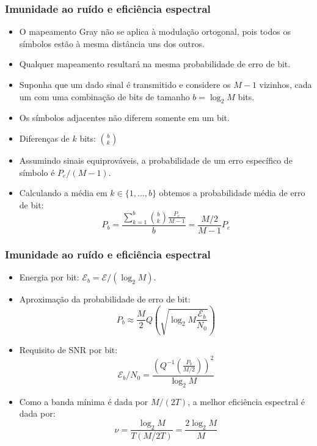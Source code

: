 \begin{frame}
	\frametitle{Imunidade ao ruído e eficiência espectral}

	\begin{itemize}
	    \item O mapeamento Gray não se aplica à modulação ortogonal, pois todos os símbolos estão à mesma distância uns dos outros.
	    \item Qualquer mapeamento resultará na mesma probabilidade de erro de bit.
	    \item Suponha que um dado sinal é transmitido e considere os $M-1$ vizinhos, cada um com uma combinação de bits de tamanho $b=\log_2 M$ bits.
	    \item Os símbolos adjacentes não diferem somente em um bit.
	    \item Diferenças de $k$ bits: $\binom{b}{k}$	    
	    \item Assumindo sinais equiprováveis, a probabilidade de um erro específico de símbolo é $P_e/(M-1)$.
	    \item Calculando a média em $k\in \{1,\ldots,b \}$ obtemos a probabilidade média de erro de bit:
	    \begin{equation*}
		P_b = \frac{\sum\limits_{k=1}^b \binom{b}{k}\frac{P_e}{M-1}}{b} = \frac{M/2}{M-1}P_e
	    \end{equation*}	
	\end{itemize}	
\end{frame}

\begin{frame}
	\frametitle{Imunidade ao ruído e eficiência espectral}

	\begin{itemize}
	    \item Energia por bit: $\mathcal{E}_b = \mathcal{E} / (\log_2 M)$.
	    \item Aproximação da probabilidade de erro de bit:
	    \begin{equation*}
		  P_b \approx \frac{M}{2}Q\left(\sqrt{\log_2 M \frac{\mathcal{E}_b}{N_0} } \right)
	    \end{equation*}
	    \item Requisito de SNR por bit:
	    \begin{equation*}
		  \mathcal{E}_b/N_0 = \frac{\left( Q^{-1}\left( \frac{P_b}{M/2} \right) \right)^2}{\log_2 M}
	    \end{equation*}
	    \item Como a banda mínima é dada por $M/(2T)$, a melhor eficiência espectral é dada por:
	    \begin{equation*}
		    \nu = \frac{\log_2 M}{T(M/2T)} = \frac{2\log_2 M}{M}
	    \end{equation*}
	\end{itemize}
\end{frame}

